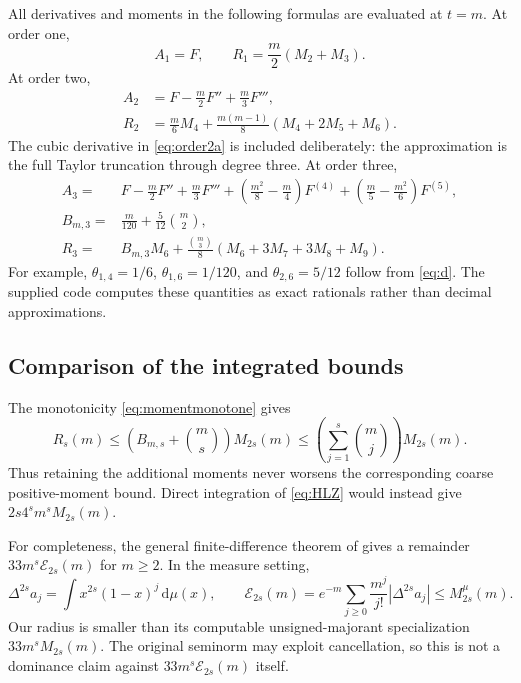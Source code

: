 \documentclass[11pt,a4paper]{article}
\theoremstyle{definition}
\newcommand{\dd}{\,\mathrm d}
\begin{document}
All derivatives and moments in the following formulas are evaluated at
$t=m$. At order one,
\begin{equation}\label{eq:order1}
 A_1=F,\qquad R_1=\frac m2(M_2+M_3).
\end{equation}
At order two,
\begin{align}
 A_2&=F-\frac m2 F''+\frac m3F''',\label{eq:order2a}\\
 R_2&=\frac m6M_4+\frac{m(m-1)}8(M_4+2M_5+M_6).
 \label{eq:order2r}
\end{align}
The cubic derivative in \eqref{eq:order2a} is included deliberately:
the approximation is the full Taylor truncation through degree three.
At order three,
\begin{align}
 A_3={}&F-\frac m2F''+\frac m3F'''
       +\left(\frac{m^2}8-\frac m4\right)F^{(4)}
       +\left(\frac m5-\frac{m^2}6\right)F^{(5)},
       \label{eq:order3a}\\
 B_{m,3}={}&\frac m{120}+\frac5{12}\binom m2,\nonumber\\
 R_3={}&B_{m,3}M_6+\frac{\binom m3}{8}
               (M_6+3M_7+3M_8+M_9).
       \label{eq:order3r}
\end{align}
For example, $\theta_{1,4}=1/6$,
$\theta_{1,6}=1/120$, and $\theta_{2,6}=5/12$ follow from
\eqref{eq:d}. The supplied code computes these quantities as exact
rationals rather than decimal approximations.

\subsection{Comparison of the integrated bounds}

The monotonicity \eqref{eq:momentmonotone} gives
\begin{equation}\label{eq:coarseradius}
 R_s(m)\le
 \left(B_{m,s}+\binom ms\right)M_{2s}(m)
 \le\left(\sum_{j=1}^s\binom mj\right)M_{2s}(m).
\end{equation}
Thus retaining the additional moments never worsens the corresponding
coarse positive-moment bound. Direct integration of \eqref{eq:HLZ}
would instead give $2s4^s m^sM_{2s}(m)$.

For completeness, the general finite-difference theorem of
\cite[Theorem~1.2, version~2]{Zacharovasv2} gives a remainder
$33m^s\mathcal E_{2s}(m)$ for $m\ge2$. In the measure setting,
\[
 \Delta^{2s}a_j=\int x^{2s}(1-x)^j\dd\mu(x),\qquad
 \mathcal E_{2s}(m)
 =e^{-m}\sum_{j\ge0}\frac{m^j}{j!}|\Delta^{2s}a_j|
 \le M_{2s}^{\mu}(m).
\]
Our radius is smaller than its computable unsigned-majorant specialization
$33m^sM_{2s}(m)$. The original seminorm may exploit cancellation, so this
is not a dominance claim against $33m^s\mathcal E_{2s}(m)$ itself.
\end{document}
